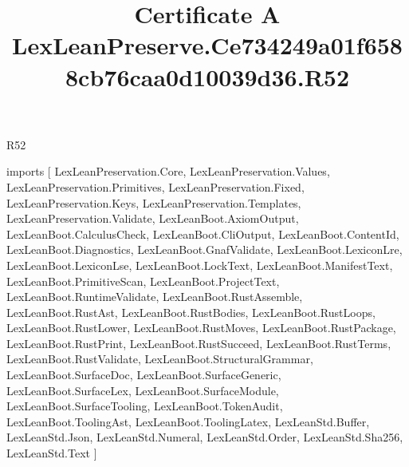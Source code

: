 \begin{lexlean}{R52}
\title{Certificate A LexLeanPreserve.Ce734249a01f6588cb76caa0d10039d36.R52}
\begin{coremodule}
imports [
  LexLeanPreservation.Core,
  LexLeanPreservation.Values,
  LexLeanPreservation.Primitives,
  LexLeanPreservation.Fixed,
  LexLeanPreservation.Keys,
  LexLeanPreservation.Templates,
  LexLeanPreservation.Validate,
  LexLeanBoot.AxiomOutput,
  LexLeanBoot.CalculusCheck,
  LexLeanBoot.CliOutput,
  LexLeanBoot.ContentId,
  LexLeanBoot.Diagnostics,
  LexLeanBoot.GnafValidate,
  LexLeanBoot.LexiconLre,
  LexLeanBoot.LexiconLse,
  LexLeanBoot.LockText,
  LexLeanBoot.ManifestText,
  LexLeanBoot.PrimitiveScan,
  LexLeanBoot.ProjectText,
  LexLeanBoot.RuntimeValidate,
  LexLeanBoot.RustAssemble,
  LexLeanBoot.RustAst,
  LexLeanBoot.RustBodies,
  LexLeanBoot.RustLoops,
  LexLeanBoot.RustLower,
  LexLeanBoot.RustMoves,
  LexLeanBoot.RustPackage,
  LexLeanBoot.RustPrint,
  LexLeanBoot.RustSucceed,
  LexLeanBoot.RustTerms,
  LexLeanBoot.RustValidate,
  LexLeanBoot.StructuralGrammar,
  LexLeanBoot.SurfaceDoc,
  LexLeanBoot.SurfaceGeneric,
  LexLeanBoot.SurfaceLex,
  LexLeanBoot.SurfaceModule,
  LexLeanBoot.SurfaceTooling,
  LexLeanBoot.TokenAudit,
  LexLeanBoot.ToolingAst,
  LexLeanBoot.ToolingLatex,
  LexLeanStd.Buffer,
  LexLeanStd.Json,
  LexLeanStd.Numeral,
  LexLeanStd.Order,
  LexLeanStd.Sha256,
  LexLeanStd.Text
]


\end{coremodule}
\end{lexlean}
